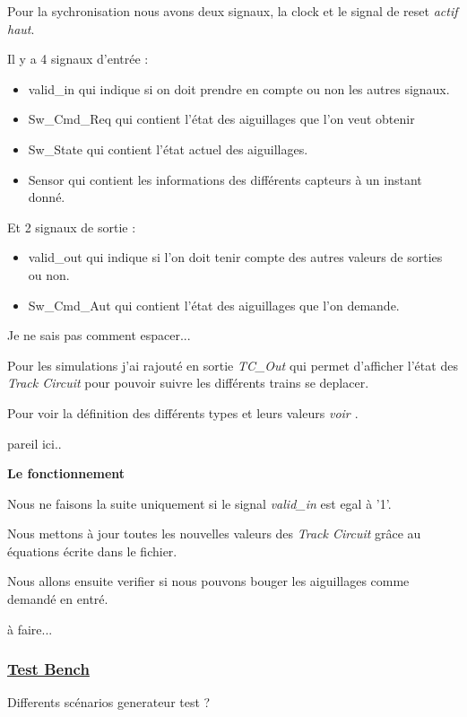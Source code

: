 Pour la sychronisation nous avons deux signaux, la clock et le signal
de reset \emph{actif haut}.

Il y a 4 signaux d'entrée :

\begin{itemize}
  \item valid\_in qui indique si on doit prendre en compte ou non les
    autres signaux.
  \item Sw\_Cmd\_Req qui contient l'état des aiguillages que l'on veut obtenir
  \item Sw\_State qui contient l'état actuel des aiguillages.
  \item Sensor qui contient les informations des différents capteurs à
    un instant donné.
\end{itemize}  

Et 2 signaux de sortie :

\begin{itemize}
  \item valid\_out qui indique si l'on doit tenir compte des autres
    valeurs de sorties ou non.
  \item Sw\_Cmd\_Aut qui contient l'état des aiguillages que l'on demande.
\end{itemize}  

Je ne sais pas comment espacer...

Pour les simulations j'ai rajouté en sortie \emph{TC\_Out} qui permet
d'afficher l'état des \emph{Track Circuit} pour pouvoir suivre les
différents trains se deplacer. 

Pour voir la définition des différents types et leurs valeurs \emph{voir \cite{interface}}.

pareil ici..

\textbf{Le fonctionnement}

Nous ne faisons la suite uniquement si le signal \emph{valid\_in} est egal à '1'.

Nous mettons à jour toutes les nouvelles valeurs des \emph{Track
  Circuit} grâce au équations écrite dans le fichier.

Nous allons ensuite verifier si nous pouvons bouger les aiguillages
comme demandé en entré.

à faire...

\subsubsection{\underline{Test Bench}}
\label{sec:Test_Bench}

Differents scénarios
generateur test ?


